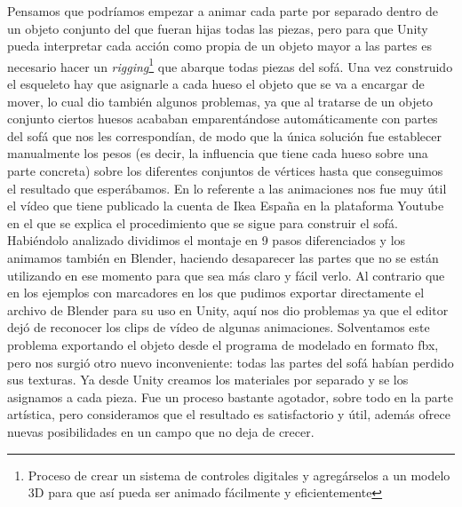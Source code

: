 Pensamos que podríamos empezar a animar cada parte por separado dentro de un objeto conjunto del que fueran hijas todas las piezas, pero para que Unity pueda interpretar cada acción como propia de un objeto mayor a las partes es necesario hacer un \textit{rigging}\footnote{ Proceso de crear un sistema de controles digitales y agregárselos a un modelo 3D para que así pueda ser animado fácilmente y eficientemente} que abarque todas piezas del sofá. Una vez construido el esqueleto hay que asignarle a cada hueso el objeto que se va a encargar de mover, lo cual dio también algunos problemas, ya que al tratarse de un objeto conjunto ciertos huesos acababan emparentándose automáticamente con partes del sofá que nos les correspondían, de modo que la única solución fue establecer manualmente los pesos (es decir, la influencia que tiene cada hueso sobre una parte concreta) sobre los diferentes conjuntos de vértices hasta que conseguimos el resultado que esperábamos.
En lo referente a las animaciones nos fue muy útil el vídeo que tiene publicado la cuenta de Ikea España en la plataforma Youtube \cite{IkeaYT} en el que se explica el procedimiento que se sigue para construir el sofá. Habiéndolo analizado dividimos el montaje en 9 pasos diferenciados y los animamos también en Blender, haciendo desaparecer las partes que no se están utilizando en ese momento para que sea más claro y fácil verlo.
Al contrario que en los ejemplos con marcadores en los que pudimos exportar directamente el archivo de Blender para su uso en Unity, aquí nos dio problemas ya que el editor dejó de reconocer los clips de vídeo de algunas animaciones. Solventamos este problema exportando el objeto desde el programa de modelado en formato fbx, pero nos surgió otro nuevo inconveniente: todas las partes del sofá habían perdido sus texturas. Ya desde Unity creamos los materiales por separado y se los asignamos a cada pieza.
Fue un proceso bastante agotador, sobre todo en la parte artística, pero consideramos que el resultado es satisfactorio y útil, además ofrece nuevas posibilidades en un campo que no deja de crecer.

